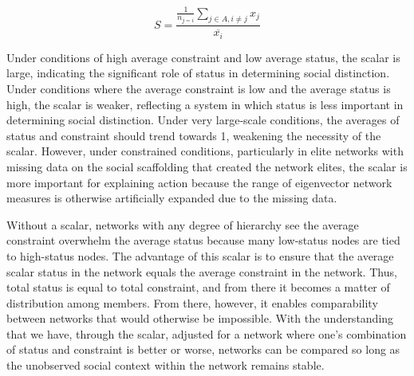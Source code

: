 \[S=\frac{\frac{1}{n_{j=i}}\sum_{{j}\in{A},i\neq{j}}x_{j}}{\overline{x_i}} \]

Under conditions of high average constraint and low average status, the scalar is large, indicating the significant role of status in determining social distinction. Under conditions where the average constraint is low and the average status is high, the scalar is weaker, reflecting a system in which status is less important in determining social distinction. Under very large-scale conditions, the averages of status and constraint should trend towards 1, weakening the necessity of the scalar. However, under constrained conditions, particularly in elite networks with missing data on the social scaffolding that created the network elites, the scalar is more important for explaining action because the range of eigenvector network measures is otherwise artificially expanded due to the missing data.  

Without a scalar, networks with any degree of hierarchy see the average constraint overwhelm the average status because many low-status nodes are tied to high-status nodes. The advantage of this scalar is to ensure that the average scalar status in the network equals the average constraint in the network. Thus, total status is equal to total constraint, and from there it becomes a matter of distribution among members. From there, however, it enables comparability between networks that would otherwise be impossible. With the understanding that we have, through the scalar, adjusted for a network where one's combination of status and constraint is better or worse, networks can be compared so long as the unobserved social context within the network remains stable. 